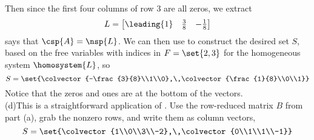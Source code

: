 %
Then since the first four columns of row 3 are all zeros, we extract
%
\begin{equation*}
L=
\begin{bmatrix}
\leading{1} & \frac{3}{8} & -\frac{1}{8}
\end{bmatrix}
\end{equation*}
%
 says that $\csp{A}=\nsp{L}$.  We can then use   to construct the desired set $S$, based on the free variables with indices in $F=\set{2,3}$ for the homogeneous system $\homosystem{L}$, so
%
\begin{equation*}
S=\set{\colvector{-\frac{3}{8}\\1\\0},\,\colvector{\frac{1}{8}\\0\\1}}
\end{equation*}
%
Notice that the zeros and ones are at the bottom of the vectors.\\
%
(d)\quad This is a straightforward application of .  Use the row-reduced matrix $B$ from part (a), grab the nonzero rows, and write them as column vectors,
%
\begin{equation*}
S=\set{\colvector{1\\0\\3\\-2},\,\colvector{0\\1\\1\\-1}}
\end{equation*}
